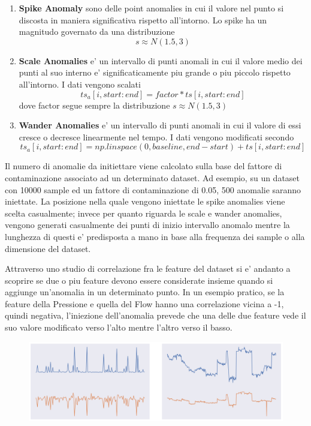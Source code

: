 \begin{enumerate}
\item \textbf{Spike Anomaly} sono delle point anomalies in cui il valore nel punto si discosta in maniera significativa rispetto all'intorno. Lo spike ha un magnitudo governato da una distribuzione \[s \approx N(1.5, 3) \]
\item \textbf{Scale Anomalies} e' un intervallo di punti anomali in cui il  valore medio dei punti al suo interno e' significaticamente piu grande o piu piccolo rispetto all'intorno. I dati vengono scalati \[ ts_a[i, start:end] = factor*ts[i, start:end]\] dove factor segue sempre la distribuzione \(s \approx N(1.5, 3) \)
\item \textbf{Wander Anomalies} e' un intervallo di punti anomali in cui il valore di essi cresce o decresce linearmente nel tempo. I dati vengono modificati secondo \[ ts_a[i, start:end] = np.linspace(0, baseline, end-start) + ts[i, start:end] \] 
\end{enumerate}

Il numero di anomalie da initiettare viene calcolato sulla base del fattore di contaminazione associato ad un determinato dataset. Ad esempio, su un dataset con 10000 sample ed un fattore di contaminazione di 0.05, 500 anomalie saranno iniettate.
La posizione nella quale vengono iniettate le spike anomalies viene scelta casualmente; invece per quanto riguarda le scale e wander anomalies, vengono generati casualmente dei punti di inizio intervallo anomalo mentre la lunghezza di questi e' predisposta a mano in base alla frequenza dei sample o alla dimensione del dataset.

Attraverso uno studio di correlazione fra le feature del dataset si e' andanto a scoprire se due o piu feature devono essere considerate insieme quando si aggiunge un'anomalia in un determinato punto. In un esempio pratico, se la feature della Pressione e quella del Flow hanno una correlazione vicina a -1, quindi negativa, l'iniezione dell'anomalia prevede che una delle due feature vede il suo valore modificato verso l'alto mentre l'altro verso il basso. 
\begin{figure}[t]
\includegraphics[width=14cm, scale=1]{images/corr}
\centering
\end{figure}

